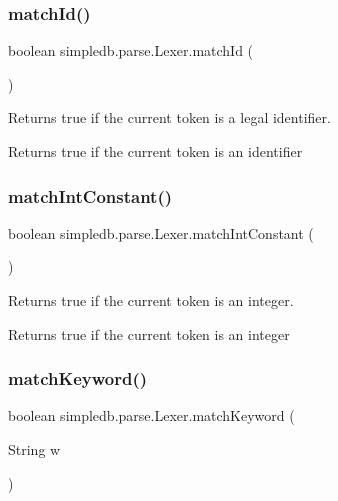 \subsubsection{\texorpdfstring{match\+Id()}{matchId()}}
{\footnotesize\ttfamily boolean simpledb.\+parse.\+Lexer.\+match\+Id (\begin{DoxyParamCaption}{ }\end{DoxyParamCaption})\hspace{0.3cm}{\ttfamily [inline]}}

Returns true if the current token is a legal identifier. \begin{DoxyReturn}{Returns}
true if the current token is an identifier 
\end{DoxyReturn}
\mbox{\label{classsimpledb_1_1parse_1_1Lexer_a2356cc7664be66956a0282bae224f0af}} 
\subsubsection{\texorpdfstring{match\+Int\+Constant()}{matchIntConstant()}}
{\footnotesize\ttfamily boolean simpledb.\+parse.\+Lexer.\+match\+Int\+Constant (\begin{DoxyParamCaption}{ }\end{DoxyParamCaption})\hspace{0.3cm}{\ttfamily [inline]}}

Returns true if the current token is an integer. \begin{DoxyReturn}{Returns}
true if the current token is an integer 
\end{DoxyReturn}
\mbox{\label{classsimpledb_1_1parse_1_1Lexer_ad7ef9a56476573552f41c072251a4106}} 
\subsubsection{\texorpdfstring{match\+Keyword()}{matchKeyword()}}
{\footnotesize\ttfamily boolean simpledb.\+parse.\+Lexer.\+match\+Keyword (\begin{DoxyParamCaption}\item[{String}]{w }\end{DoxyParamCaption})\hspace{0.3cm}{\ttfamily [inline]}}

